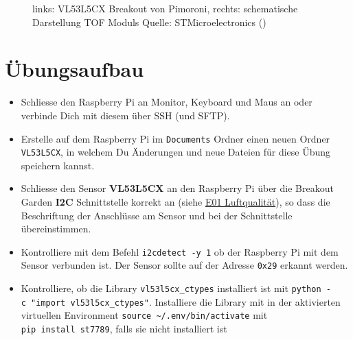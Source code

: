 \documentclass[
  11pt,
  a4paperpaper,
  oneside, openany  ,captions=tableheading
]{scrbook}
\providecommand{\tightlist}{%
  \setlength{\itemsep}{0pt}\setlength{\parskip}{0pt}}
\theoremstyle{definition}
\theoremstyle{remark}
\begin{document}
\begin{figure}


\caption{\label{fig-vl53l5cx}links: VL53L5CX Breakout von Pimoroni,
rechts: schematische Darstellung TOF Moduls Quelle: STMicroelectronics
()}

\end{figure}%

\section{Übungsaufbau}\label{uxfcbungsaufbau-3}

\begin{itemize}
\tightlist
\item
  Schliesse den Raspberry Pi an Monitor, Keyboard und Maus an oder
  verbinde Dich mit diesem über SSH (und SFTP).
\item
  Erstelle auf dem Raspberry Pi im \texttt{Documents} Ordner einen neuen
  Ordner \texttt{VL53L5CX}, in welchem Du Änderungen und neue Dateien
  für diese Übung speichern kannst.
\item
  Schliesse den Sensor \textbf{VL53L5CX} an den Raspberry Pi über die
  Breakout Garden \textbf{I2C} Schnittstelle korrekt an (siehe
  \href{E01_Luftqualitaet.qmd}{E01 Luftqualität}), so dass die
  Beschriftung der Anschlüsse am Sensor und bei der Schnittstelle
  übereinstimmen.
\item
  Kontrolliere mit dem Befehl \texttt{i2cdetect\ -y\ 1} ob der Raspberry
  Pi mit dem Sensor verbunden ist. Der Sensor sollte auf der Adresse
  \texttt{0x29} erkannt werden.
\item
  Kontrolliere, ob die Library \texttt{vl53l5cx\_ctypes} installiert ist
  mit \texttt{python\ -c\ "import\ vl53l5cx\_ctypes"}. Installiere die
  Library mit in der aktivierten virtuellen Environment
  \texttt{source\ \textasciitilde{}/.env/bin/activate} mit
  \texttt{pip\ install\ st7789}, falls sie nicht installiert ist
\end{itemize}
\end{document}
